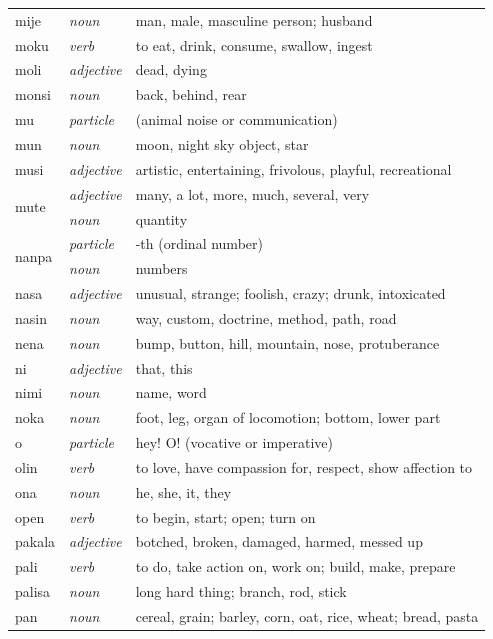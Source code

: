 \documentclass[14pt, a4paper]{extreport}
\begin{document}
\begin{longtable}{llp{10cm}}
  mije & \textit{noun} & man, male, masculine person; husband \\
  moku & \textit{verb} & to eat, drink, consume, swallow, ingest \\
  moli & \textit{adjective} & dead, dying \\
  monsi & \textit{noun} & back, behind, rear \\
  mu & \textit{particle} & (animal noise or communication) \\
  mun & \textit{noun} & moon, night sky object, star \\
  musi & \textit{adjective} & artistic, entertaining, frivolous, playful, recreational \\
  \multirow[t]{2}{*}{mute} & \textit{adjective} & many, a lot, more, much, several, very \\
  & \textit{noun} & quantity \\
  \multirow[t]{2}{*}{nanpa} & \textit{particle} & -th (ordinal number) \\
  & \textit{noun} & numbers \\
  nasa & \textit{adjective} & unusual, strange; foolish, crazy; drunk, intoxicated \\
  nasin & \textit{noun} & way, custom, doctrine, method, path, road \\
  nena & \textit{noun} & bump, button, hill, mountain, nose, protuberance \\
  ni & \textit{adjective} & that, this \\
  nimi & \textit{noun} & name, word \\
  noka & \textit{noun} & foot, leg, organ of locomotion; bottom, lower part \\
  o & \textit{particle} & hey! O! (vocative or imperative) \\
  olin & \textit{verb} & to love, have compassion for, respect, show affection to \\
  ona & \textit{noun} & he, she, it, they \\
  open & \textit{verb} & to begin, start; open; turn on \\
  pakala & \textit{adjective} & botched, broken, damaged, harmed, messed up \\
  pali & \textit{verb} & to do, take action on, work on; build, make, prepare \\
  palisa & \textit{noun} & long hard thing; branch, rod, stick \\
  pan & \textit{noun} & cereal, grain; barley, corn, oat, rice, wheat; bread, pasta \\

\end{longtable}
\end{document}
